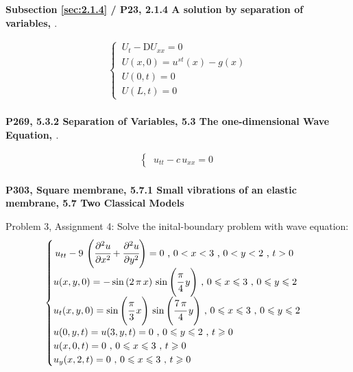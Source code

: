 \documentclass[../main.tex]{subfiles}
\begin{document}
\textbf{Subsection \ref{sec:2.1.4} / P23, 2.1.4 A solution by separation of variables, \cite{salsa2016partial}}.

\begin{align}
    \begin{cases} \nonumber
    \, U_t - \mathrm{D} U_{xx} = 0 \\
    \, U(x,0) = u^{st}(x) - g(x) \\
    \, U(0,t) = 0 \\
    \, U(L,t) = 0
    \end{cases}
\end{align} \\

\textbf{P269, 5.3.2 Separation of Variables, 5.3 The one-dimensional Wave Equation, \cite{salsa2016partial}}.

\begin{align}
    \begin{cases} \nonumber
        \, u_{tt} - c \, u_{xx} = 0
    \end{cases}
\end{align} \\

\textbf{P303, Square membrane, 5.7.1 Small vibrations of an elastic membrane, 5.7 Two Classical Models}

Problem 3, Assignment 4: Solve the inital-boundary problem with wave equation:
\begin{align}
    \begin{cases} \nonumber
        \, u_{tt} - 9 \, \left(\cfrac{\partial^2 u}{\partial x^2} + \cfrac{\partial^2 u}{\partial y^2}\right) = 0 \text{ ,  } 0 < x < 3 \text{ ,  } 0 < y < 2 \text{ ,  } t > 0 \\
        u(x, y, 0) = - \sin{(2 \, \pi \, x)} \, \sin{\left(\cfrac{\pi}{4} \, y \right)} \text{ ,  } 0 \leqslant x \leqslant 3 \text{ ,  } 0 \leqslant y \leqslant 2 \\
        u_t(x, y, 0) = \sin{\left(\cfrac{\pi}{3} \, x \right)} \, \sin{\left(\cfrac{7 \, \pi}{4} \, y \right)} \text{ ,  } 0 \leqslant x \leqslant 3 \text{ ,  } 0 \leqslant y \leqslant 2 \\
        u(0, y, t) = u(3, y, t) = 0 \text{ ,  } 0 \leqslant y \leqslant 2 \text{ ,  } t \geqslant 0 \\
        u(x, 0, t) = 0 \text{ ,  } 0 \leqslant x \leqslant 3 \text{ ,  } t \geqslant 0 \\
        u_y(x, 2, t) = 0 \text{ ,  } 0 \leqslant x \leqslant 3 \text{ ,  } t \geqslant 0
    \end{cases}
\end{align}
\end{document}
